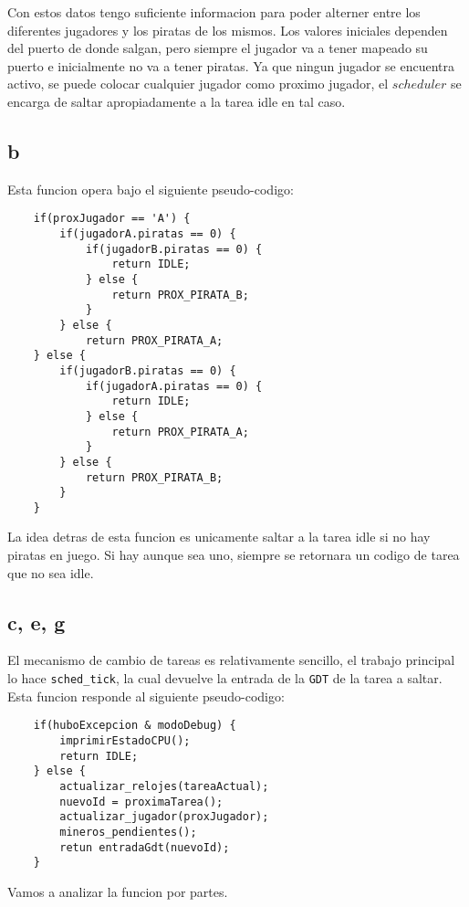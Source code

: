 Con estos datos tengo suficiente informacion para poder alterner entre los diferentes jugadores y los piratas de los mismos. Los valores iniciales dependen del puerto de donde salgan, pero siempre el jugador va a tener mapeado su puerto e inicialmente no va a tener piratas. Ya que ningun jugador se encuentra activo, se puede colocar cualquier jugador como proximo jugador, el $scheduler$ se encarga de saltar apropiadamente a la tarea idle en tal caso.

\subsection{b}

Esta funcion opera bajo el siguiente pseudo-codigo:\\

\begin{lstlisting}
	if(proxJugador == 'A') {
		if(jugadorA.piratas == 0) {
			if(jugadorB.piratas == 0) {
				return IDLE;
			} else {
				return PROX_PIRATA_B;
			}
		} else {
			return PROX_PIRATA_A;
	} else {
		if(jugadorB.piratas == 0) {
			if(jugadorA.piratas == 0) {
				return IDLE;
			} else {
				return PROX_PIRATA_A;
			}
		} else {
			return PROX_PIRATA_B;
		}
	}
\end{lstlisting}

La idea detras de esta funcion es unicamente saltar a la tarea idle si no hay piratas en juego. Si hay aunque sea uno, siempre se retornara un codigo de tarea que no sea idle.

\subsection{c, e, g}

El mecanismo de cambio de tareas es relativamente sencillo, el trabajo principal lo hace \texttt{sched\_tick}, la cual devuelve la entrada de la \texttt{GDT} de la tarea a saltar. Esta funcion responde al siguiente pseudo-codigo:

\begin{lstlisting}
	if(huboExcepcion & modoDebug) {
		imprimirEstadoCPU();
		return IDLE;
	} else {
		actualizar_relojes(tareaActual);
		nuevoId = proximaTarea();
		actualizar_jugador(proxJugador);
		mineros_pendientes();
		retun entradaGdt(nuevoId);
	}
\end{lstlisting}

Vamos a analizar la funcion por partes.


